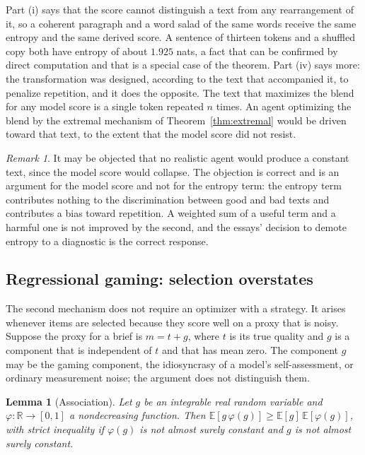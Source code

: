 \documentclass[11pt]{article}
\theoremstyle{plain}
\newtheorem{lemma}[theorem]{Lemma}
\theoremstyle{definition}
\theoremstyle{remark}
\newtheorem{remark}[theorem]{Remark}
\newcommand{\R}{\mathbb{R}}
\newcommand{\E}{\mathbb{E}}
\begin{document}
Part (i) says that the score cannot distinguish a text from any rearrangement of it, so a coherent paragraph and a word salad of the same words receive the same entropy and the same derived score. A sentence of thirteen tokens and a shuffled copy both have entropy of about $1.925$ nats, a fact that can be confirmed by direct computation and that is a special case of the theorem. Part (iv) says more: the transformation was designed, according to the text that accompanied it, to penalize repetition, and it does the opposite. The text that maximizes the blend for any model score is a single token repeated $n$ times. An agent optimizing the blend by the extremal mechanism of Theorem~\ref{thm:extremal} would be driven toward that text, to the extent that the model score did not resist.

\begin{remark}
It may be objected that no realistic agent would produce a constant text, since the model score would collapse. The objection is correct and is an argument for the model score and not for the entropy term: the entropy term contributes nothing to the discrimination between good and bad texts and contributes a bias toward repetition. A weighted sum of a useful term and a harmful one is not improved by the second, and the essays' decision to demote entropy to a diagnostic is the correct response.
\end{remark}

\subsection{Regressional gaming: selection overstates}

The second mechanism does not require an optimizer with a strategy. It arises whenever items are selected because they score well on a proxy that is noisy. Suppose the proxy for a brief is $m=t+g$, where $t$ is its true quality and $g$ is a component that is independent of $t$ and that has mean zero. The component $g$ may be the gaming component, the idiosyncrasy of a model's self-assessment, or ordinary measurement noise; the argument does not distinguish them.

\begin{lemma}[Association]\label{lem:assoc}
Let $g$ be an integrable real random variable and $\varphi:\R\to[0,1]$ a nondecreasing function. Then $\E[g\,\varphi(g)]\ge\E[g]\,\E[\varphi(g)]$, with strict inequality if $\varphi(g)$ is not almost surely constant and $g$ is not almost surely constant.
\end{lemma}
\end{document}
